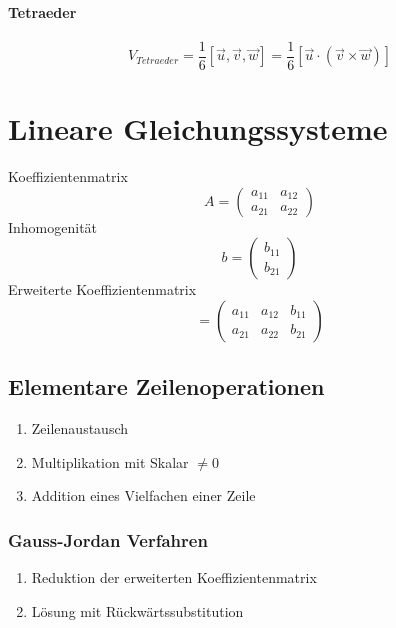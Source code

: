 \documentclass{report}
\begin{document}
\subsubsection{Tetraeder}
\begin{equation}V_{Tetraeder} = \frac{1}{6}[\vec{u}, \vec{v}, \vec{w}] = \frac{1}{6}[\vec{u} \cdot (\vec{v} \times \vec{w})]\end{equation}
\chapter{Lineare Gleichungssysteme}
Koeffizientenmatrix
\begin{equation}A = \left(\begin{matrix}a_{11} & a_{12}\\a_{21} & a_{22}\end{matrix}\right)\end{equation}
Inhomogenität
\begin{equation}b = \left(\begin{matrix}b_{11} \\ b_{21}\end{matrix}\right)\end{equation}
Erweiterte Koeffizientenmatrix
\begin{equation}[A,b] = \left(\begin{matrix}a_{11} & a_{12} & b_{11}\\a_{21} & a_{22} & b_{21}\end{matrix}\right)\end{equation}
\section{Elementare Zeilenoperationen}
\begin{enumerate}\item Zeilenaustausch
\item Multiplikation mit Skalar $\neq 0$
\item Addition eines Vielfachen einer Zeile\end{enumerate}
\subsection{Gauss-Jordan Verfahren}
\begin{enumerate}\item Reduktion der erweiterten Koeffizientenmatrix
\item Lösung mit Rückwärtssubstitution\end{enumerate}
\end{document}
